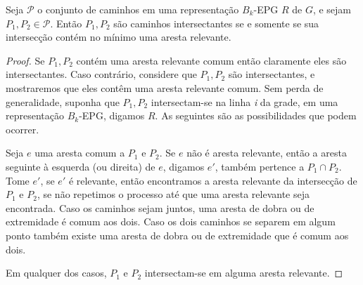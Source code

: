 \begin{lema}\label{lem:relevantEdges}
Seja $\mathcal{P}$ o conjunto de caminhos em uma representação $B_k$-EPG $R$ de $G$, e sejam $P_1,P_2 \in \mathcal{P}$. Então $P_1, P_2$ são caminhos intersectantes se e somente se sua intersecção contém no mínimo uma aresta relevante.%
\end{lema}

\begin{proof}
Se $P_1, P_2$ contém uma aresta relevante comum então claramente eles são intersectantes. Caso contrário, considere que $P_1, P_2$ são intersectantes, e mostraremos que eles contêm uma aresta relevante comum. Sem perda de generalidade, suponha que $P_1, P_2$ intersectam-se na linha \textit{i} da grade, em uma representação   $B_k$-EPG, digamos $R$. As seguintes são as possibilidades que podem ocorrer. 

Seja $e$ uma aresta comum a $P_1$ e $P_2$. Se $e$ não é aresta relevante, então a aresta seguinte à  esquerda (ou direita) de $e$, digamos $e'$, também pertence a $P_1 \cap P_2$. Tome $e'$, se $e'$ é relevante, então encontramos a aresta relevante da intersecção de $P_1$ e $P_2$, se não repetimos o processo até que uma aresta relevante seja encontrada. Caso os caminhos sejam juntos, uma aresta de dobra ou de extremidade é comum aos dois. Caso os dois caminhos se separem em algum ponto também existe uma aresta de dobra ou de extremidade que é comum aos dois.






 
Em qualquer dos casos, $P_1$ e $P_2$ intersectam-se em alguma aresta relevante.
\end{proof}

